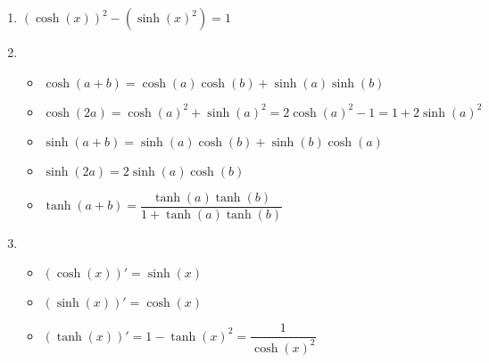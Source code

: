 \documentclass[a4paper, 12pt]{article}
\begin{document}
\begin{proprietes}
    \begin{enumerate}
        \item $(\cosh(x))^2 - (\sinh(x)^2) = 1$
        \item \begin{itemize}
            \item $\cosh(a+b) = \cosh(a) \cosh(b) + \sinh(a) \sinh(b)$
            \item $\cosh(2a) = \cosh(a)^2 + \sinh(a)^2 = 2 \cosh(a)^2 - 1 = 1 + 2 \sinh(a)^2$
            \item $\sinh(a+b) = \sinh(a)\cosh(b) + \sinh(b)\cosh(a)$
            \item $\sinh(2a) = 2\sinh(a)\cosh(b)$
            \item $\tanh(a+b) = \dfrac{\tanh(a) \tanh(b)}{1 + \tanh(a) \tanh(b)}$
        \end{itemize}
        \item \begin{itemize}
            \item $(\cosh(x))' = \sinh(x)$
            \item $(\sinh(x))' = \cosh(x)$
            \item $(\tanh(x))' = 1 - \tanh(x)^2 = \dfrac{1}{\cosh(x)^2}$
        \end{itemize}
    \end{enumerate}
\end{proprietes}
\end{document}
